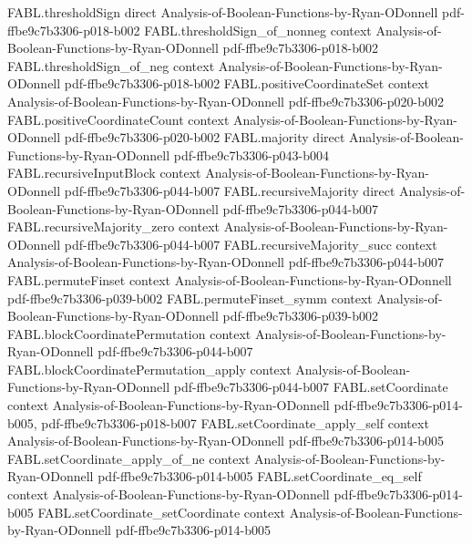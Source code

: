 \begin{theorem}
\proofstep
  {FABL.thresholdSign}
  {direct}
  {Analysis-of-Boolean-Functions-by-Ryan-ODonnell}
  {pdf-ffbe9c7b3306-p018-b002}
\proofstep
  {FABL.thresholdSign_of_nonneg}
  {context}
  {Analysis-of-Boolean-Functions-by-Ryan-ODonnell}
  {pdf-ffbe9c7b3306-p018-b002}
\proofstep
  {FABL.thresholdSign_of_neg}
  {context}
  {Analysis-of-Boolean-Functions-by-Ryan-ODonnell}
  {pdf-ffbe9c7b3306-p018-b002}
\proofstep
  {FABL.positiveCoordinateSet}
  {context}
  {Analysis-of-Boolean-Functions-by-Ryan-ODonnell}
  {pdf-ffbe9c7b3306-p020-b002}
\proofstep
  {FABL.positiveCoordinateCount}
  {context}
  {Analysis-of-Boolean-Functions-by-Ryan-ODonnell}
  {pdf-ffbe9c7b3306-p020-b002}
\proofstep
  {FABL.majority}
  {direct}
  {Analysis-of-Boolean-Functions-by-Ryan-ODonnell}
  {pdf-ffbe9c7b3306-p043-b004}
\proofstep
  {FABL.recursiveInputBlock}
  {context}
  {Analysis-of-Boolean-Functions-by-Ryan-ODonnell}
  {pdf-ffbe9c7b3306-p044-b007}
\proofstep
  {FABL.recursiveMajority}
  {direct}
  {Analysis-of-Boolean-Functions-by-Ryan-ODonnell}
  {pdf-ffbe9c7b3306-p044-b007}
\proofstep
  {FABL.recursiveMajority_zero}
  {context}
  {Analysis-of-Boolean-Functions-by-Ryan-ODonnell}
  {pdf-ffbe9c7b3306-p044-b007}
\proofstep
  {FABL.recursiveMajority_succ}
  {context}
  {Analysis-of-Boolean-Functions-by-Ryan-ODonnell}
  {pdf-ffbe9c7b3306-p044-b007}
\proofstep
  {FABL.permuteFinset}
  {context}
  {Analysis-of-Boolean-Functions-by-Ryan-ODonnell}
  {pdf-ffbe9c7b3306-p039-b002}
\proofstep
  {FABL.permuteFinset_symm}
  {context}
  {Analysis-of-Boolean-Functions-by-Ryan-ODonnell}
  {pdf-ffbe9c7b3306-p039-b002}
\proofstep
  {FABL.blockCoordinatePermutation}
  {context}
  {Analysis-of-Boolean-Functions-by-Ryan-ODonnell}
  {pdf-ffbe9c7b3306-p044-b007}
\proofstep
  {FABL.blockCoordinatePermutation_apply}
  {context}
  {Analysis-of-Boolean-Functions-by-Ryan-ODonnell}
  {pdf-ffbe9c7b3306-p044-b007}
\proofstep
  {FABL.setCoordinate}
  {context}
  {Analysis-of-Boolean-Functions-by-Ryan-ODonnell}
  {pdf-ffbe9c7b3306-p014-b005,
    pdf-ffbe9c7b3306-p018-b007}
\proofstep
  {FABL.setCoordinate_apply_self}
  {context}
  {Analysis-of-Boolean-Functions-by-Ryan-ODonnell}
  {pdf-ffbe9c7b3306-p014-b005}
\proofstep
  {FABL.setCoordinate_apply_of_ne}
  {context}
  {Analysis-of-Boolean-Functions-by-Ryan-ODonnell}
  {pdf-ffbe9c7b3306-p014-b005}
\proofstep
  {FABL.setCoordinate_eq_self}
  {context}
  {Analysis-of-Boolean-Functions-by-Ryan-ODonnell}
  {pdf-ffbe9c7b3306-p014-b005}
\proofstep
  {FABL.setCoordinate_setCoordinate}
  {context}
  {Analysis-of-Boolean-Functions-by-Ryan-ODonnell}
  {pdf-ffbe9c7b3306-p014-b005}

\end{theorem}

